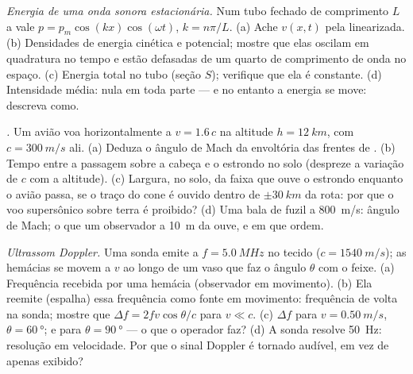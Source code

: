 \begin{exercise}[$\star\star\star$]\label{exo:b2:sound-waves:10}
\emph{Energia de uma onda sonora estacionária.} Num tubo fechado de comprimento $L$
a  vale $p = p_m\cos(kx)\cos(\omega t)$, $k = n\pi/L$. (a) Ache $v(x,
t)$ pela  linearizada. (b) Densidades de energia cinética e
potencial; mostre que elas oscilam em quadratura no tempo e
estão defasadas de um quarto de comprimento de onda no espaço. (c) Energia total no
tubo (seção $S$); verifique que ela é constante. (d) Intensidade média: nula
em toda parte --- e no entanto a energia se move: descreva como.
\end{exercise}

\begin{exercise}[$\star\star\star$]\label{exo:b2:sound-waves:11}
\emph{.} Um avião voa horizontalmente a $v = 1.6\,c$ na
altitude $h = \qty{12}{km}$, com $c = \qty{300}{m/s}$ ali. (a) Deduza o ângulo de
Mach da envoltória das frentes de . (b) Tempo entre
a passagem sobre a cabeça e o estrondo no solo (despreze a variação
de $c$ com a altitude). (c) Largura, no solo, da faixa que ouve
o estrondo enquanto o avião passa, se o traço do cone é ouvido dentro de
$\pm\qty{30}{km}$ da rota: por que o voo supersônico sobre terra
é proibido? (d) Uma bala de fuzil a \qty{800}{m/s}: ângulo de Mach; o que um observador
a \qty{10}{m} da  ouve, e em que ordem.
\end{exercise}

\begin{exercise}[$\star\star\star$]\label{exo:b2:sound-waves:12}
\emph{Ultrassom Doppler.} Uma sonda emite a $f = \qty{5.0}{MHz}$ no tecido
($c = \qty{1540}{m/s}$); as hemácias se movem a $v$ ao longo de um vaso que faz o
ângulo $\theta$ com o feixe. (a) Frequência recebida por uma hemácia (observador
em movimento). (b) Ela reemite (espalha) essa frequência como fonte em movimento:
frequência de volta na sonda; mostre que $\Delta f = 2fv\cos\theta/c$ para $v \ll c$. (c)
$\Delta f$ para $v = \qty{0.50}{m/s}$, $\theta = \qty{60}{\degree}$; e para $\theta = \qty{90}{\degree}$
--- o que o operador faz? (d) A sonda resolve \qty{50}{Hz}:
resolução em velocidade. Por que o sinal Doppler é tornado audível, em vez de
apenas exibido?
\end{exercise}

